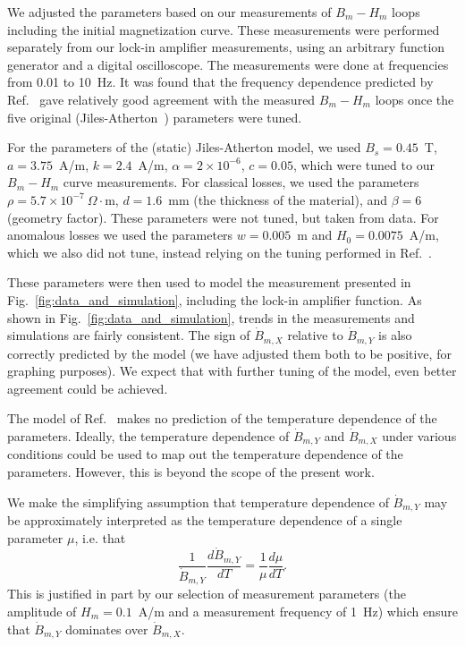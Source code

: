 We adjusted the parameters based on our
measurements of $B_m-H_m$ loops including the initial magnetization
curve.  These measurements were performed separately from our lock-in
amplifier measurements, using an arbitrary function generator and a
digital oscilloscope.  The measurements were done at
frequencies from 0.01 to 10~Hz.  It was found that the frequency
dependence predicted by Ref.~\cite{jiles1994frequency} gave relatively good
agreement with the measured $B_m-H_m$ loops once the five original
(Jiles-Atherton~\cite{jiles1984theory,jiles1986theory}) parameters were tuned.

For the parameters of the (static) Jiles-Atherton model, we used
$B_s=0.45$~T, $a=3.75$~A/m, $k=2.4$~A/m, $\alpha=2\times 10^{-6}$,
$c=0.05$, which were tuned to our $B_m-H_m$ curve measurements.  For
classical losses, we used the parameters $\rho=5.7\times
10^{-7}~\Omega\cdot$m, $d=1.6$~mm (the thickness of the material), and
$\beta=6$ (geometry factor).  These parameters were not tuned, but
taken from data.  For anomalous losses we used the parameters
$w=0.005$~m and $H_0=0.0075$~A/m, which we also did not tune, instead
relying on the tuning performed in Ref.~\cite{jiles1994frequency}.

These parameters were then used to model the measurement presented in
Fig.~\ref{fig:data_and_simulation}, including the lock-in amplifier
function.  As shown in Fig.~\ref{fig:data_and_simulation}, trends in
the measurements and simulations are fairly consistent.  The sign of
$\dot{B}_{m,X}$ relative to $\dot{B}_{m,Y}$ is also correctly
predicted by the model (we have adjusted them both to be positive, for
graphing purposes).  We expect that with further tuning of the model,
even better agreement could be achieved.





The model of Ref.~\cite{jiles1994frequency} makes no prediction of the
temperature dependence of the parameters.  Ideally, the temperature
dependence of $\dot{B}_{m,Y}$ and $\dot{B}_{m,X}$ under various
conditions could be used to map out the temperature dependence of the
parameters.  However, this is beyond the scope of the present work.

We make the simplifying assumption that temperature dependence of
$\dot{B}_{m,Y}$ may be approximately interpreted as the temperature
dependence of a single parameter $\mu$, i.e. that
\begin{equation}
\frac{1}{\dot{B}_{m,Y}}\frac{d\dot{B}_{m,Y}}{dT}=\frac{1}{\mu}\frac{d\mu}{dT}.
\end{equation}
This is justified in part by our selection of measurement parameters
(the amplitude of $H_m=0.1$~A/m and a measurement frequency of 1~Hz)
which ensure that $\dot{B}_{m,Y}$ dominates over $\dot{B}_{m,X}$.

